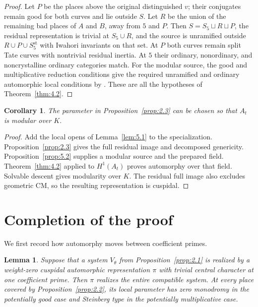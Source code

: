 \documentclass[11pt,a4paper]{article}
\newtheorem{lemma}[theorem]{Lemma}
\newtheorem{corollary}[theorem]{Corollary}
\numberwithin{equation}{section}
\begin{document}
\begin{proof}
Let \(P\) be the places above the original distinguished \(v\); their conjugates remain good for both curves and lie outside \(S\). Let \(R\) be the union of the remaining bad places of \(A\) and \(B\), away from \(5\) and \(P\). Then \(S=S_5\sqcup R\sqcup P\), the residual representation is trivial at \(S_5\cup R\), and the source is unramified outside \(R\cup P\cup S_5^{\mathrm{st}}\) with Iwahori invariants on that set. At \(P\) both curves remain split Tate curves with nontrivial residual inertia. At \(5\) their ordinary, nonordinary, and noncrystalline ordinary categories match. For the modular source, the good and multiplicative reduction conditions give the required unramified and ordinary automorphic local conditions by \cite[Lemmas~6.1.3 and~6.1.7]{CN}. These are all the hypotheses of Theorem~\ref{thm:4.2}.
\end{proof}

\begin{corollary}\label{cor:5.3}
The parameter in Proposition~\ref{prop:2.3} can be chosen so that \(A_t\) is modular over \(K\).
\end{corollary}

\begin{proof}
Add the local opens of Lemma~\ref{lem:5.1} to the specialization. Proposition~\ref{prop:2.3} gives the full residual image and decomposed genericity. Proposition~\ref{prop:5.2} supplies a modular source and the prepared field. Theorem~\ref{thm:4.2} applied to \(H^1(A_t)\) proves automorphy over that field. Solvable descent \cite[Proposition~6.5.13]{ACC} gives modularity over \(K\). The residual full image also excludes geometric CM, so the resulting representation is cuspidal.
\end{proof}

\section{Completion of the proof}
\label{sec:6}

We first record how automorphy moves between coefficient primes.

\begin{lemma}\label{lem:6.1}
Suppose that a system \(V_\theta\) from Proposition~\ref{prop:2.1} is realized by a weight-zero cuspidal automorphic representation \(\pi\) with trivial central character at one coefficient prime. Then \(\pi\) realizes the entire compatible system. At every place covered by Proposition~\ref{prop:2.2}, its local parameter has zero monodromy in the potentially good case and Steinberg type in the potentially multiplicative case.
\end{lemma}
\end{document}
